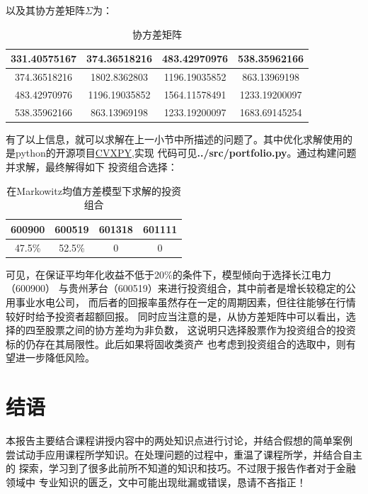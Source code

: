 \documentclass[UTF8]{ctexart}
\numberwithin{figure}{section}
\numberwithin{table}{section}
\numberwithin{equation}{section}
\begin{document}
    以及其协方差矩阵$\Sigma$为：
   
    \begin{table}[H]
        \centering
        \begin{tabular}{|c|c|c|c|}
        \hline
        331.40575167 & 374.36518216  & 483.42970976  & 538.35962166  \\ \hline
        374.36518216 & 1802.8362803  & 1196.19035852 & 863.13969198  \\ \hline
        483.42970976 & 1196.19035852 & 1564.11578491 & 1233.19200097 \\ \hline
        538.35962166 & 863.13969198  & 1233.19200097 & 1683.69145254 \\ \hline
        \end{tabular}
        \caption{协方差矩阵}
    \end{table}

        有了以上信息，就可以求解在上一小节中所描述的问题了。其中优化求解使用的
    是python的开源项目\href{https://www.cvxpy.org/index.html}{CVXPY},实现
    代码可见\textbf{../src/portfolio.py}。通过构建问题并求解，最终解得如下
    投资组合选择：

    \begin{table}[H]
        \centering
        \begin{tabular}{|c|c|c|c|}
        \hline
        600900 & 600519 & 601318 & 601111 \\ \hline
        47.5\% & 52.5\% & 0      & 0      \\ \hline
        \end{tabular}
        \caption{在Markowitz均值方差模型下求解的投资组合}
    \end{table}

        可见，在保证平均年化收益不低于20\%的条件下，模型倾向于选择长江电力（600900）
    与贵州茅台（600519）来进行投资组合，其中前者是增长较稳定的公用事业水电公司，
    而后者的回报率虽然存在一定的周期因素，但往往能够在行情较好时给予投资者超额回报。
    同时应当注意的是，从协方差矩阵中可以看出，选择的四至股票之间的协方差均为非负数，
    这说明只选择股票作为投资组合的投资标的仍存在其局限性。此后如果将固收类资产
    也考虑到投资组合的选取中，则有望进一步降低风险。

    \section{结语}
        本报告主要结合课程讲授内容中的两处知识点进行讨论，并结合假想的简单案例
    尝试动手应用课程所学知识。在处理问题的过程中，重温了课程所学，并结合自主的
    探索，学习到了很多此前所不知道的知识和技巧。不过限于报告作者对于金融领域中
    专业知识的匮乏，文中可能出现纰漏或错误，恳请不吝指正！
\end{document}
